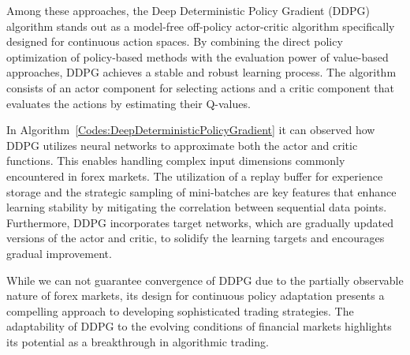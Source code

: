 Among these approaches, the Deep Deterministic Policy Gradient (DDPG) algorithm stands out as a model-free off-policy actor-critic algorithm specifically designed for continuous action spaces. By combining the direct policy optimization of policy-based methods with the evaluation power of value-based approaches, DDPG achieves a stable and robust learning process. The algorithm consists of an actor component for selecting actions and a critic component that evaluates the actions by estimating their Q-values.



In Algorithm~\ref{Codes:DeepDeterministicPolicyGradient} it can observed how DDPG utilizes neural networks to approximate both the actor and critic functions. This enables handling complex input dimensions commonly encountered in forex markets. The utilization of a replay buffer for experience storage and the strategic sampling of mini-batches are key features that enhance learning stability by mitigating the correlation between sequential data points. Furthermore, DDPG incorporates target networks, which are gradually updated versions of the actor and critic, to solidify the learning targets and encourages gradual improvement.

While we can not guarantee convergence of DDPG due to the partially observable nature of forex markets, its design for continuous policy adaptation presents a compelling approach to developing sophisticated trading strategies. The adaptability of DDPG to the evolving conditions of financial markets highlights its potential as a breakthrough in algorithmic trading.
